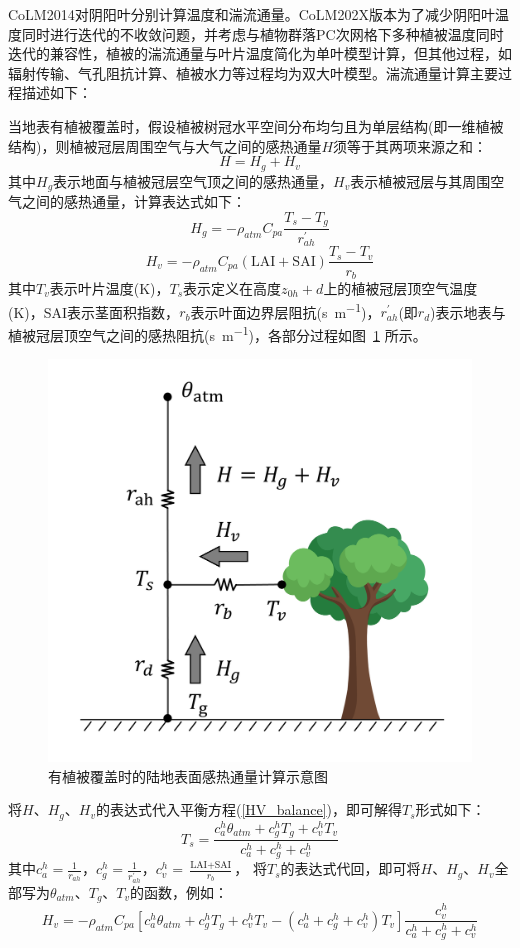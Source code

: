 CoLM2014对阴阳叶分别计算温度和湍流通量。CoLM202X版本为了减少阴阳叶温度同时进行迭代的不收敛问题，并考虑与植物群落PC次网格下多种植被温度同时迭代的兼容性，植被的湍流通量与叶片温度简化为单叶模型计算，但其他过程，如辐射传输、气孔阻抗计算、植被水力等过程均为双大叶模型。湍流通量计算主要过程描述如下：

当地表有植被覆盖时，假设植被树冠水平空间分布均匀且为单层结构(即一维植被结构)，则植被冠层周围空气与大气之间的感热通量$H$须等于其两项来源之和：
\begin{equation}\label{HV_balance}
H=H_{g}+H_{v}
\end{equation}
其中$H_{g}$表示地面与植被冠层空气顶之间的感热通量，$H_{v}$表示植被冠层与其周围空气之间的感热通量，计算表达式如下：
\begin{equation}
H_{g}=-\rho_{atm} C_{pa} \frac{T_{s}-T_{g}}{r_{a h}^{\prime}}
\end{equation}
\begin{equation}
H_{v}=-\rho_{atm} C_{pa}(\text {LAI}+\text {SAI}) \frac{T_{s}-T_{v}}{r_{b}}
\end{equation}
其中$T_v$表示叶片温度(K)，$T_s$表示定义在高度$z_{0h}+d$上的植被冠层顶空气温度(K)，SAI表示茎面积指数，$r_b$表示叶面边界层阻抗(\unit{s.m^{-1}})，$r_{ah}^\prime$(即$r_d$)表示地表与植被冠层顶空气之间的感热阻抗(\unit{s.m^{-1}})，各部分过程如图~\ref{fig:有植被覆盖部分的陆地表面感热通量示意图} 所示。
{
\begin{figure}[htbp]
\centering
\includegraphics[width=0.6\linewidth]{Figures/地表湍流交换过程/有植被感热交换阻抗示意图.png}
\caption{有植被覆盖时的陆地表面感热通量计算示意图}
\label{fig:有植被覆盖部分的陆地表面感热通量示意图}
\end{figure}
}
将$H$、$H_{g}$、$H_{v}$的表达式代入平衡方程(\ref{HV_balance})，即可解得$T_s$形式如下：
\begin{equation}
T_{s}=\frac{c_{a}^{h} \theta_{atm}+c_{g}^{h} T_{g}+c_{v}^{h} T_{v}}{c_{a}^{h}+c_{g}^{h}+c_{v}^{h}}
\end{equation}
其中$c_a^h=\frac{1}{r_{ah}}$，$c_g^h=\frac{1}{r_{ah}^\prime}$，$c_v^h=\frac{\text {LAI}+\text {SAI}}{r_b}$，
将$T_s$的表达式代回，即可将$H$、$H_{g}$、$H_{v}$全部写为$\theta_{atm}$、$T_g$、$T_v$的函数，例如：
\begin{equation}
H_{v}=-\rho_{atm} C_{p a}\left[c_{a}^{h} \theta_{atm}+c_{g}^{h} 
T_{g}+c_{v}^{h} T_{v}-\left(c_{a}^{h}+c_{g}^{h}+c_{v}^{h}\right)
T_{v}\right] \frac{c_{v}^{h}}{c_{a}^{h}+c_{g}^{h}+c_{v}^{h}}
\end{equation}


